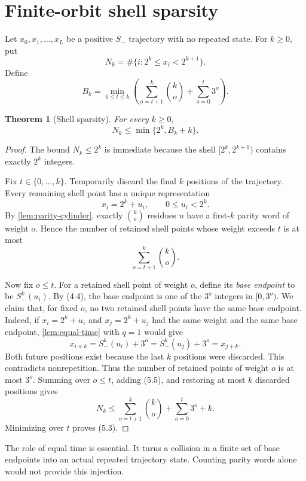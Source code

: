 \documentclass[11pt]{article}
\newtheorem{theorem}{Theorem}[section]
\theoremstyle{definition}
\theoremstyle{remark}
\newcommand{\Sm}{S_{-}}
\begin{document}
\section{Finite-orbit shell sparsity}\label{sec:shell}

Let $x_0,x_1,\ldots,x_L$ be a positive $\Sm$ trajectory with no repeated
state.  For $k\ge0$, put
\[
 N_k=\#\{i:2^k\le x_i<2^{k+1}\}.                    \tag{5.1}
\]
Define
\[
 B_k=\min_{0\le t\le k}
 \left(
   \sum_{o=t+1}^k\binom{k}{o}
   +\sum_{o=0}^t3^o
 \right).                                             \tag{5.2}
\]

\begin{theorem}[Shell sparsity]\label{thm:shell}
For every $k\ge0$,
\[
 N_k\le\min\{2^k,B_k+k\}.                            \tag{5.3}
\]
\end{theorem}

\begin{proof}
The bound $N_k\le2^k$ is immediate because the shell
$[2^k,2^{k+1})$ contains exactly $2^k$ integers.

Fix $t\in\{0,\ldots,k\}$.  Temporarily discard the final $k$ positions of
the trajectory.  Every remaining shell point has a unique representation
\[
 x_i=2^k+u_i,
 \qquad0\le u_i<2^k.                                  \tag{5.4}
\]
By \cref{lem:parity-cylinder}, exactly $\binom{k}{o}$ residues $u$ have a
first-$k$ parity word of weight $o$.  Hence the number of retained shell
points whose weight exceeds $t$ is at most
\[
 \sum_{o=t+1}^k\binom{k}{o}.                          \tag{5.5}
\]

Now fix $o\le t$.  For a retained shell point of weight $o$, define its
\emph{base endpoint} to be $\Sm^k(u_i)$.  By \textup{(4.4)}, the base endpoint
is one of the $3^o$ integers in $[0,3^o)$.  We claim that, for fixed $o$, no
two retained shell points have the same base endpoint.  Indeed, if
$x_i=2^k+u_i$ and $x_j=2^k+u_j$ had the same weight and the same base
endpoint, \cref{lem:equal-time} with $q=1$ would give
\[
 x_{i+k}=\Sm^k(u_i)+3^o
        =\Sm^k(u_j)+3^o=x_{j+k}.
\]
Both future positions exist because the last $k$ positions were discarded.
This contradicts nonrepetition.  Thus the number of retained points of
weight $o$ is at most $3^o$.  Summing over $o\le t$, adding \textup{(5.5)},
and restoring at most $k$ discarded positions gives
\[
 N_k\le
 \sum_{o=t+1}^k\binom{k}{o}+\sum_{o=0}^t3^o+k.
\]
Minimizing over $t$ proves \textup{(5.3)}.
\end{proof}

The role of equal time is essential.  It turns a collision in a finite set
of base endpoints into an actual repeated trajectory state.  Counting parity
words alone would not provide this injection.
\end{document}
